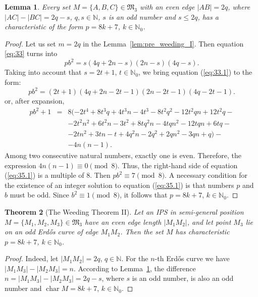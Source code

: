 \documentclass[a4paper,14pt]{article} %
\theoremstyle{plain}
\newtheorem{theorem}{Theorem}[section]
\newtheorem{lemma}[theorem]{Lemma}
\theoremstyle{definition}
\begin{document}
\begin{lemma}
	\label{lem:pre_weeding_II}
	Every set $M = \{A, B, C\} \in \mathfrak{M}_3$ with an even edge $|AB| = 2q$, where $|AC| - |BC| = 2q - s$, $q, s \in \mathbb{N}$, $s$ is an odd number and $s \leq 2q$, has a characteristic of the form $p = 8k + 7$, $k \in \mathbb{N}_0$.
\end{lemma}

\begin{proof}
	Let us set $m = 2q$ in the Lemma~\ref{lem:pre_weeding_I}.
	Then equation \eqref{eq:33} turns into
	\begin{equation}
		\label{eq:33.1}
		pb^2 = s(4q + 2n - s)(2n - s)(4q - s).
	\end{equation}
	Taking into account that $s = 2t + 1$, $t \in \mathbb{N}_0$,
	we bring equation (\ref{eq:33.1}) to the form:
	\begin{equation}
	pb^2 = (2t + 1)(4q + 2n - 2t - 1)(2n - 2t - 1)(4q - 2t - 1).
	\label{eq: 34.2}
	\end{equation}
	or, after expansion,
	\begin{eqnarray}
		pb^2 + 1&=& 8(-2t^4+8t^3q+4t^3n-4t^3-8t^2q^2-12t^2qn+12t^2q- {}\nonumber\\
			 &     &-2t^2n^2+6t^2n-3t^2+8tq^2n-4tqn^2-12tqn+6tq- {}\nonumber\\
			 &     &-2tn^2+3tn-t+4q^2n-2q^2+2qn^2-3qn+q)-  {}\nonumber\\
			   &     &-4n(n-1).
		\label{eq:35.1}
	\end{eqnarray}
	Among two consecutive natural numbers,
	exactly one is even.
	Therefore, the expression $4n(n-1)\equiv0\pmod{8}$.
	Thus, the right-hand side of equation (\ref{eq:35.1}) is a multiple of 8.
	Then $pb^2\equiv7\pmod{8}$.
	A necessary condition for the existence of an integer solution to equation (\ref{eq:35.1})
	is that numbers $p$ and $b$ must be odd.
	Since $b^2\equiv1\pmod{8}$, it follows that $p=8k+7$, $k\in\mathbb{N}_0$.
\end{proof}

\begin{theorem}[The Weeding Theorem II]
	\label{thm:weeding_II}
	Let an IPS in semi-general position $M=\{M_1, M_2, M_3\}\in{\mathfrak{M}_{3}}$ have an even edge length $|M_1 M_2|$, and let point $M_3$ lie on an odd Erdős curve of edge $M_1 M_2$.
	Then the set $M$ has characteristic $p=8k+7$, $k\in \mathbb{N}_{0}$.
\end{theorem}

\begin{proof}
	Indeed, let $|M_1 M_2|=2q$, $q \in \mathbb{N}$.
	For the $n$-th Erdős curve we have $|M_1 M_3|-|M_2 M_3|=n$.
	According to Lemma~\ref{lem:pre_weeding_II}, the difference $n=|M_1 M_3|-|M_2 M_3|=2q-s$,
	where $s$ is an odd number,
	is also an odd number and $\operatorname{char} M = 8k + 7$, $k\in \mathbb{N}_{0}$.
\end{proof}
\end{document}
